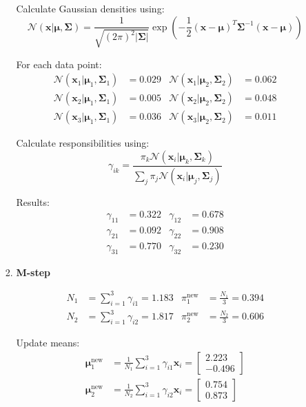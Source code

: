 \documentclass{article}
\begin{document}
\begin{enumerate}[leftmargin=\labelsep]
\begin{enumerate}
\begin{enumerate}
Calculate Gaussian densities using:
\[ \mathcal{N}(\mathbf{x}|\boldsymbol{\mu},\boldsymbol{\Sigma}) = \frac{1}{\sqrt{(2\pi)^2|\boldsymbol{\Sigma}|}} \exp\left(-\frac{1}{2}(\mathbf{x}-\boldsymbol{\mu})^T\boldsymbol{\Sigma}^{-1}(\mathbf{x}-\boldsymbol{\mu})\right) \]

For each data point:
\begin{align*}
\mathcal{N}(\mathbf{x}_1|\boldsymbol{\mu}_1,\boldsymbol{\Sigma}_1) &= 0.029 &
\mathcal{N}(\mathbf{x}_1|\boldsymbol{\mu}_2,\boldsymbol{\Sigma}_2) &= 0.062 \\
\mathcal{N}(\mathbf{x}_2|\boldsymbol{\mu}_1,\boldsymbol{\Sigma}_1) &= 0.005 &
\mathcal{N}(\mathbf{x}_2|\boldsymbol{\mu}_2,\boldsymbol{\Sigma}_2) &= 0.048 \\
\mathcal{N}(\mathbf{x}_3|\boldsymbol{\mu}_1,\boldsymbol{\Sigma}_1) &= 0.036 &
\mathcal{N}(\mathbf{x}_3|\boldsymbol{\mu}_2,\boldsymbol{\Sigma}_2) &= 0.011 
\end{align*}

Calculate responsibilities using:
\[ \gamma_{ik} = \frac{\pi_k \mathcal{N}(\mathbf{x}_i|\boldsymbol{\mu}_k,\boldsymbol{\Sigma}_k)}{\sum_j \pi_j \mathcal{N}(\mathbf{x}_i|\boldsymbol{\mu}_j,\boldsymbol{\Sigma}_j)} \]

Results:
\begin{align*}
\gamma_{11} &= 0.322 &
\gamma_{12} &= 0.678 \\
\gamma_{21} &= 0.092 &
\gamma_{22} &= 0.908 \\
\gamma_{31} &= 0.770 &
\gamma_{32} &= 0.230
\end{align*}
\newpage
\item \textbf{M-step}

\begin{align*}
N_1 &= \sum_{i=1}^3 \gamma_{i1} = 1.183 & \pi_1^{\text{new}} &= \frac{N_1}{3} = 0.394 \\
N_2 &= \sum_{i=1}^3 \gamma_{i2} = 1.817 & \pi_2^{\text{new}} &= \frac{N_2}{3} = 0.606
\end{align*}

Update means:
\begin{align*}
\boldsymbol{\mu}_1^{\text{new}} &= \frac{1}{N_1}\sum_{i=1}^3 \gamma_{i1}\mathbf{x}_i = \begin{bmatrix} 2.223 \\ -0.496 \end{bmatrix} \\
\boldsymbol{\mu}_2^{\text{new}} &= \frac{1}{N_2}\sum_{i=1}^3 \gamma_{i2}\mathbf{x}_i = \begin{bmatrix} 0.754 \\ 0.873 \end{bmatrix}
\end{align*}


\end{enumerate}
\end{enumerate}
\end{enumerate}
\end{document}
